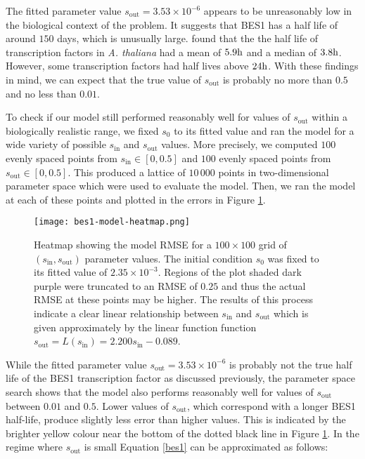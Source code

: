 \medskip

The fitted parameter value $s_{\text{out}} = 3.53 \times 10^{-6}$ appears to be unreasonably low in the biological context of the problem. It suggests that BES1 has a half life of around $150$ days, which is unusually large. \cite{narsai2007} found that the the half life of transcription factors in \emph{A. thaliana} had a mean of $5.9\h$ and a median of $3.8\h$. However, some transcription factors had half lives above $24\h$. With these findings in mind, we can expect that the true value of $s_{\text{out}}$ is probably no more than $0.5$ and no less than $0.01$.

\medskip

To check if our model still performed reasonably well for values of $s_{\text{out}}$ within a biologically realistic range, we fixed $s_{0}$ to its fitted value and ran the model for a wide variety of possible $s_{\text{in}}$ and $s_{\text{out}}$ values. More precisely, we computed $100$ evenly spaced points from $s_{\text{in}} \in [0, 0.5]$ and $100$ evenly spaced points from $s_{\text{out}} \in [0, 0.5]$. This produced a lattice of $10\,000$ points in two-dimensional parameter space which were used to evaluate the model. Then, we ran the model at each of these points and plotted in the errors in Figure \ref{fig:bes1-model-heatmap}.

\begin{figure}
    \centering
    \texttt{[image: bes1-model-heatmap.png]}
    \caption{Heatmap showing the model RMSE for a $100 \times 100$ grid of $(s_{\text{in}}, s_{\text{out}})$ parameter values. The initial condition $s_{0}$ was fixed to its fitted value of $2.35 \times 10^{-3}$. Regions of the plot shaded dark purple were truncated to an RMSE of $0.25$ and thus the actual RMSE at these points may be higher. The results of this process indicate a clear linear relationship between $s_{\text{in}}$ and $s_{\text{out}}$ which is given approximately by the linear function function $s_{\text{out}} = L(s_{\text{in}}) = 2.200s_{\text{in}} - 0.089$. }
    \label{fig:bes1-model-heatmap}
\end{figure}

\medskip

While the fitted parameter value $s_{\text{out}} = 3.53 \times 10^{-6}$ is probably not the true half life of the BES1 transcription factor as discussed previously, the parameter space search shows that the model also performs reasonably well for values of $s_{\text{out}}$ between $0.01$ and $0.5$. Lower values of $s_{\text{out}}$, which correspond with a longer BES1 half-life, produce slightly less error than higher values. This is indicated by the brighter yellow colour near the bottom of the dotted black line in Figure \ref{fig:bes1-model-heatmap}. In the regime where $s_{\text{out}}$ is small Equation \eqref{bes1} can be approximated as follows:


